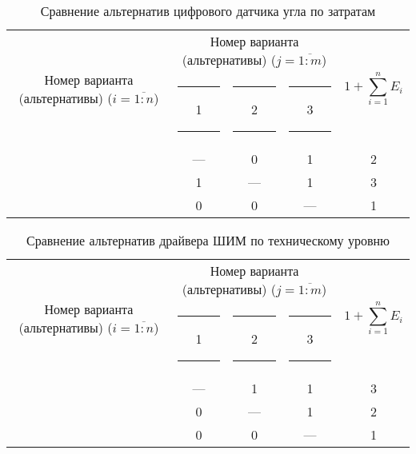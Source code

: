 \begin{table}[H]
    \centering
    \begin{tabular}{|c|c|c|c|c|}
        \hline
        \multirow{2}{2.4cm}[-0.5pc]{
            \centering
            Номер варианта (альтернативы) ($i = \overline{1:n}$)
        } &
        \multicolumn{3}{c|}{
            \parbox[t]{2.4cm}{
                \centering
                Номер варианта (альтернативы) ($j = \overline{1:m}$)
            }
        } &
        \multirow{2}{1.7cm}{
            \centering
            $$1 + \sum_{i=1}^n E_i$$
        } \\
        &
        \centering \rule{2pt}{0pt} 1 \rule{2pt}{0pt} &
        \centering \rule{2pt}{0pt} 2 \rule{2pt}{0pt} &
        \centering \rule{2pt}{0pt} 3 \rule{2pt}{0pt} & \\
        \hline \hline
        \centering{1} &---& 0 & 1 & 2 \\ \hline
        \centering{2} & 1 &---& 1 & 3 \\ \hline
        \centering{3} & 0 & 0 &---& 1 \\ \hline
    \end{tabular}
    \caption{Сравнение альтернатив цифрового датчика угла по затратам}
    \label{tbl_sensor_cost_lvl_comparison}
\end{table}

\begin{table}[H]
    \centering
    \begin{tabular}{|c|c|c|c|c|}
        \hline
        \multirow{2}{2.4cm}[-0.5pc]{
            \centering
            Номер варианта (альтернативы) ($i = \overline{1:n}$)
        } &
        \multicolumn{3}{c|}{
            \parbox[t]{2.4cm}{
                \centering
                Номер варианта (альтернативы) ($j = \overline{1:m}$)
            }
        } &
        \multirow{2}{1.7cm}{
            \centering
            $$1 + \sum_{i=1}^n E_i$$
        } \\
        &
        \centering \rule{2pt}{0pt} 1 \rule{2pt}{0pt} &
        \centering \rule{2pt}{0pt} 2 \rule{2pt}{0pt} &
        \centering \rule{2pt}{0pt} 3 \rule{2pt}{0pt} & \\
        \hline \hline
        \centering{1} &---& 1 & 1 & 3 \\ \hline
        \centering{2} & 0 &---& 1 & 2 \\ \hline
        \centering{3} & 0 & 0 &---& 1 \\ \hline
    \end{tabular}
    \caption{Сравнение альтернатив драйвера ШИМ по техническому уровню}
    \label{tbl_drv_tech_lvl_comparison}
\end{table}

